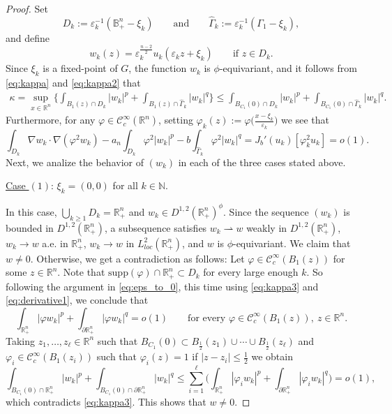 \documentclass[reqno,11pt,oneside]{amsart}
\numberwithin{equation}{section}
\def\D{\mathbb{B}^n_+}
\def\rn{\mathbb{R}^n}
\def\hn{\mathbb{R}^n_+}
\def\n{\mathbb{N}}
\def\eps{\varepsilon}
\def\rh{\rightharpoonup}
\def\ihn{\int_{\hn}}
\def\idhn{\int_{\partial\hn}}
\def\vp{\varphi}
\def\cC{\mathcal{C}}
\def\supp{\mathrm{supp}}
\def\what{\widehat}
\begin{document}
\begin{proof}
Set
$$D_k:=\eps_k^{-1}(\D-\xi_k)\qquad\text{and}\qquad\what\Gamma_k:=\eps_k^{-1}(\Gamma_1-\xi_k),$$
and define
$$w_k(z)=\eps_k^\frac{n-2}{2}u_k(\eps_kz+\xi_k)\qquad\text{if \ }z\in D_k.$$
Since $\xi_k$ is a fixed-point of $G$, the function $w_k$ is $\phi$-equivariant, and it follows from \eqref{eq:kappa} and \eqref{eq:kappa2} that
\begin{align} \label{eq:kappa3}
\kappa =\sup_{x\in\rn}\Big\{\int_{B_1(z)\cap D_k}|w_k|^p+\int_{B_1(z)\cap\what\Gamma_k}|w_k|^q\Big\}\leq \int_{B_{C_1}(0)\cap D_k}|w_k|^p+\int_{B_{C_1}(0)\cap\what\Gamma_k}|w_k|^q.
\end{align}
Furthermore, for any $\vp\in\cC^\infty_c(\rn)$, setting $\vp_k(z):=\vp\big(\frac{x-\xi_k}{\eps_k}\big)$ we see that
\begin{equation}\label{eq:derivative1}
\int_{D_k}\nabla w_k\cdot\nabla(\vp^2w_k)-a_n\int_{D_k}\vp^2|w_k|^p-b\int_{\what\Gamma_k}\vp^2|w_k|^q = J_b'(u_k)[\vp_k^2u_k]=o(1).
\end{equation}
Next, we analize the behavior of $(w_k)$ in each of the three cases stated above.

\underline{Case $(1)$}: $\xi_k=(0,0)$ for all $k\in\n$.

In this case, $\bigcup_{k\geq 1}D_k=\hn$ and $w_k\in D^{1,2}(\hn)^\phi$. Since the sequence $(w_k)$ is bounded in $D^{1,2}(\hn)$, a subsequence satisfies $w_k\rh w$ weakly in $D^{1,2}(\hn)$, $w_k\to w$ a.e. in $\hn$, $w_k\to w$ in $L^2_{loc}(\hn)$, and $w$ is $\phi$-equivariant. We claim that $w\neq 0$. Otherwise, we get a contradiction as follows: Let $\vp\in\cC^\infty_c(B_1(z))$ for some $z\in\rn$. Note that $\supp(\vp)\cap\hn\subset D_k$ for every large enough $k$. So following the argument in \eqref{eq:eps_to_0}, this time using \eqref{eq:kappa3} and \eqref{eq:derivative1}, we conclude that 
$$\ihn|\vp w_k|^p+\idhn|\vp w_k|^q = o(1)\qquad\text{for every \ }\vp\in\cC^\infty_c(B_1(z)), \ z\in\rn.$$
Taking $z_1,\ldots,z_\ell\in\rn$ such that $B_{C_1}(0)\subset B_\frac{1}{2}(z_1)\cup\cdots\cup B_\frac{1}{2}(z_\ell)$ and $\vp_i\in\cC^\infty_c(B_1(z_i))$ such that $\vp_i(z)=1$ if $|z-z_i|\leq\frac{1}{2}$ we obtain
$$\int_{B_{C_1}(0)\cap \hn}|w_k|^p+\int_{B_{C_1}(0)\cap\partial\hn}|w_k|^q\leq\sum_{i=1}^\ell\Big(\ihn|\vp_iw_k|^p+\idhn|\vp_iw_k|^q\Big)=o(1),$$
which contradicts \eqref{eq:kappa3}. This shows that $w\neq 0$.


\end{proof}
\end{document}
